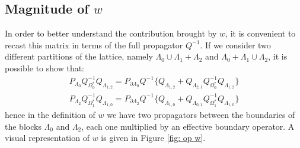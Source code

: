 \subsection{Magnitude of $w$}
In order to better understand the contribution brought by $w$, it is convenient to recast this matrix in terms of the full propagator $Q^{-1}$.
If we consider two different partitions of the lattice, namely $\Lambda_0 \cup \Lambda_1 + \Lambda_2$ and $\Lambda_0 + \Lambda_1 \cup \Lambda_2$, it is possible to show that:
\begin{equation}\label{boundary prop}
    \begin{split}
        P_{\Lambda_0} Q^{-1}_{\Omega^*_0} Q_{\Lambda_{1,2}} = P_{\partial \Lambda_0} Q^{-1} \{Q_{\Lambda_{1,2}} + Q_{\Lambda_{2,1}} Q_{\Omega_0^*}^{-1} Q_{\Lambda_{1,2}} \} \\ 
         P_{\Lambda_2} Q^{-1}_{\Omega^*_1} Q_{\Lambda_{1,0}} = P_{\partial \Lambda_2} Q^{-1} \{Q_{\Lambda_{1,0}} + Q_{\Lambda_{0,1}} Q_{\Omega_1^*}^{-1} Q_{\Lambda_{1,0}}\}
    \end{split}
\end{equation}
hence in the definition of $w$ we have two propagators between the boundaries of the blocks $\Lambda_0$ and $\Lambda_2$, each one multiplied by an effective boundary operator. A visual representation of $w$ is given in Figure \eqref{fig: op w}.
